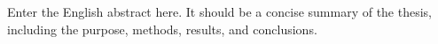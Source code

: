 \begin{abstracten}
Enter the English abstract here. It should be a concise summary of the thesis,
including the purpose, methods, results, and conclusions.

\end{abstracten}
\clearpage
